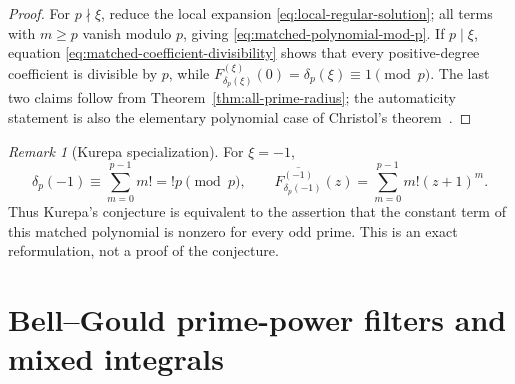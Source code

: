 \documentclass[11pt]{article}
\theoremstyle{definition}
\theoremstyle{remark}
\newtheorem{remark}[theorem]{Remark}
\begin{document}
\begin{proof}
For $p\nmid\xi$, reduce the local expansion
\eqref{eq:local-regular-solution}; all terms with $m\geq p$ vanish modulo
$p$, giving \eqref{eq:matched-polynomial-mod-p}.  If $p\mid\xi$, equation
\eqref{eq:matched-coefficient-divisibility} shows that every positive-degree
coefficient is divisible by $p$, while
$F_{\delta_p(\xi)}^{(\xi)}(0)=\delta_p(\xi)\equiv1\pmod p$.  The last two
claims follow from Theorem~\ref{thm:all-prime-radius}; the automaticity
statement is also the elementary polynomial case of Christol's
theorem~\cite{ChristolEtAl1980}.
\end{proof}

\begin{remark}[Kurepa specialization]
For $\xi=-1$,
\[
 \delta_p(-1)\equiv\sum_{m=0}^{p-1}m!=!p\pmod p,
 \qquad
 \overline{F_{\delta_p(-1)}^{(-1)}}(z)
 =\sum_{m=0}^{p-1}m!(z+1)^m.
\]
Thus Kurepa's conjecture is equivalent to the assertion that the constant
term of this matched polynomial is nonzero for every odd prime.  This is an
exact reformulation, not a proof of the conjecture.
\end{remark}


\section{Bell--Gould prime-power filters and mixed integrals}
\label{sec:touchard-mixed}
\end{document}
